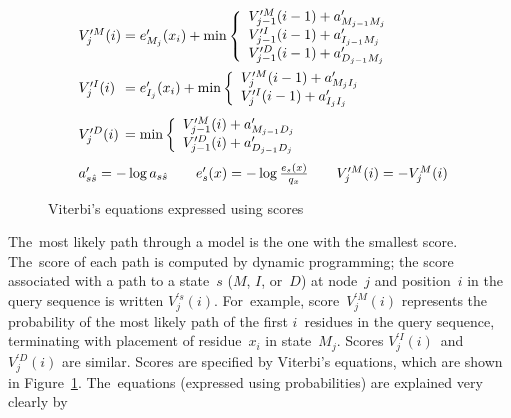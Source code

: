 \documentclass[]{jfp1}
\newcommand\figref[1]{Figure~\ref{fig:#1}}
\newcommand\figlabel[1]{\label{fig:#1}}
\begin{document}
\begin{figure}
\[
\begin{array}{l@{}c@{}l@{}}
V_{j}^{\prime M}(i) &{}={}& e^{\prime}_{M_{j}}(x_{i}) + \min \left\{
  \begin{array}{l@{}c@{}l}
  \vsum{V_{j-1}^{\prime M}(i - 1)} {a^{\prime}_{M_{j-1}M_{j}}}\\
  \vsum{V_{j-1}^{\prime I}(i - 1)} {a^{\prime}_{I_{j-1}M_{j}}}\\
  \vsum{V_{j-1}^{\prime D}(i - 1)} {a^{\prime}_{D_{j-1}M_{j}}}\\
  \end{array} \right.\\[\goo]
V_{j}^{\prime I}(i) &=& e^{\prime}_{I_{j}}(x_{i}) + \min \left\{
  \begin{array}{l@{}c@{}l}
  \vsum{V_{j}^{\prime M}(i - 1)} {a^{\prime}_{M_{j}I_{j}}}\\
  \vsum{V_{j}^{\prime I}(i - 1)} {a^{\prime}_{I_{j}I_{j}}}\\
  \end{array} \right.\\[\gum]
V_{j}^{\prime D}(i) &=& \min \left\{
  \begin{array}{l@{}c@{}l}
  \vsum{V_{j-1}^{\prime M}(i)} {a^{\prime}_{M_{j-1}D_{j}}}\\
  \vsum{V_{j-1}^{\prime D}(i)} {a^{\prime}_{D_{j-1}D_{j}}}\\
  \end{array} \right.\\[\gum]
%
\multicolumn3{l@{}}{%
  a'_{s \hat{s}} = - \log a_{s \hat{s}} 
\qquad
  e^{\prime}_{s}(x) = - \log\frac{e_{s}(x)}{q_{x}}
\qquad
  V_j^{\prime M}(i) = - V_j^{M}(i)
}
\\
\end{array}
\]

\caption{Viterbi's equations expressed using scores}
\figlabel{viterbi-transformed}
\end{figure}




The~most likely path through a model is the one with the
smallest score.
The~score of each path is computed by dynamic programming; the score associated with
a path to a state~$s$ ($M$, $I$, or~$D$) at node~$j$ and position~$i$ in
the query sequence is written $V_j^{\prime s}(i)$.
For~example, 
score~$V_j^{\prime M}(i)$ represents the probability of the most
likely path of the first $i$~residues in the query sequence,
terminating with placement of residue~$x_i$ in state~$M_j$.
Scores $V_j^{\prime I}(i)$~and~$V_j^{\prime D}(i)$ are similar.
Scores are specified by Viterbi's equations, which are shown
in \figref{viterbi-transformed}. 
The~equations (expressed using probabilities) are explained very clearly by
\citet[Chapter~5]{Durbin:1998wz}
\end{document}
